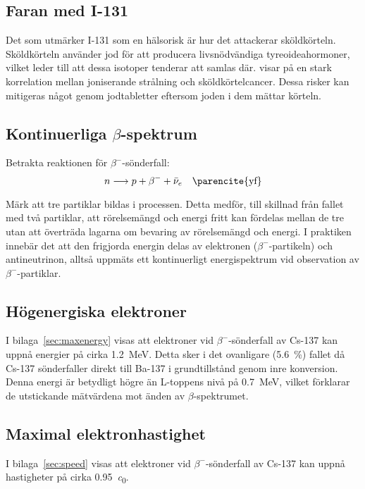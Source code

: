 \subsection{Faran med I-131}

Det som utmärker I-131 som en hälsorisk är hur det attackerar sköldkörteln.
Sköldkörteln använder jod för att producera livsnödvändiga tyreoideahormoner,
vilket leder till att dessa isotoper tenderar att samlas där. \textcite{iodine}
visar på en stark korrelation mellan joniserande strålning och
sköldkörtelcancer. Dessa risker kan mitigeras något genom jodtabletter eftersom
joden i dem mättar körteln.

\subsection{Kontinuerliga $\beta$-spektrum}

Betrakta reaktionen för $\beta^-$-sönderfall:
%
\begin{equation}
    n \longrightarrow p + \beta^- + \bar{\nu}_e \quad \text{\parencite{yf}}
\end{equation}

Märk att tre partiklar bildas i processen. Detta medför, till skillnad från
fallet med två partiklar, att rörelsemängd och energi fritt kan fördelas
mellan de tre utan att överträda lagarna om bevaring av rörelsemängd och
energi. I praktiken innebär det att den frigjorda energin delas av elektronen
($\beta^-$-partikeln) och antineutrinon, alltså uppmäts ett kontinuerligt
energispektrum vid observation av $\beta^-$-partiklar.

\subsection{Högenergiska elektroner}

I bilaga~\ref{sec:maxenergy} visas att elektroner vid $\beta^-$-sönderfall av
Cs-137 kan uppnå energier på cirka \qty{1.2}{\MeV}. Detta sker i det ovanligare
(\qty{5.6}{\percent}) fallet då Cs-137 sönderfaller direkt till Ba-137 i
grundtillstånd genom inre konversion. Denna energi är betydligt högre än
L-toppens nivå på \qty{0.7}{\MeV}, vilket förklarar de utstickande mätvärdena
mot änden av $\beta$-spektrumet.

\subsection{Maximal elektronhastighet}

I bilaga~\ref{sec:speed} visas att elektroner vid $\beta^-$-sönderfall av
Cs-137 kan uppnå hastigheter på cirka \qty{0.95}{\clight}.

